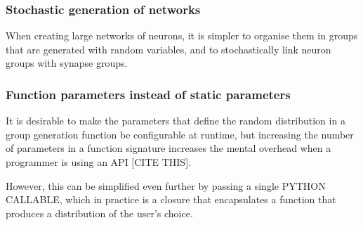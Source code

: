 \subsubsection{Stochastic generation of networks}

When creating large networks of neurons, it is simpler to organise them in
groups that are generated with random variables, and to stochastically link
neuron groups with synapse groups. 

\subsubsection{Function parameters instead of static parameters}

It is desirable to make the parameters that define the random distribution in a group
generation function be configurable at runtime, but increasing the number of
parameters in a function signature increases the mental overhead when a programmer is
using an API [CITE THIS]. 

However,
this can be simplified even further by passing a single PYTHON CALLABLE, which
in practice is a closure that encapsulates a function that produces a
distribution of the user's choice. 